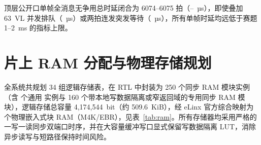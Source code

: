 顶层公开口单帧全消息无争用总时延闭合为 6074--6075 拍（\LatAvg--\Lat~µs），即使叠加 63~VL 并发排队（\LatSixtyThreePMax~µs）或两拍连发突发等待（\LatSixtyThreeBTwo~µs），所有单帧时延均远低于赛题 1--2~ms 的指标上限。

\section{片上 RAM 分配与物理存储规划}\label{sec:ramalloc}

全系统共规划 34 组逻辑存储表，在 RTL 中封装为 250 个同步 RAM 模块实例（含 \RamSdpCount{} 个通用  实例与 160 个带本地写数据隔离或窄返回域的专用同步 RAM 模块），逻辑存储总容量 4,174,544~bit（约 509.6~KiB），经 eLinx 官方综合映射为 \Mem{} 个物理嵌入式块 RAM（M4K/EBR），见表~\ref{tab:ram}。所有存储器均采用严格的一写一读同步双端口时序，并在大容量缓冲写口显式保留写数据隔离 LUT，消除异步读写与短路径保持时间风险。

